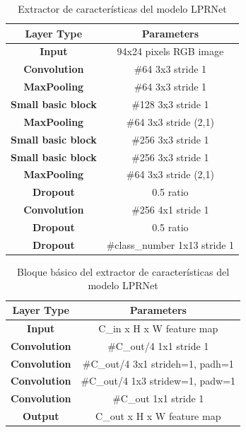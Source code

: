 \documentclass[12pt,a4paper,onecolumn,oneside]{report}
\begin{document}
\begin{table}[htb]
    \centering
    \begin{tabular}{|c|c|}
        \hline
        \textbf{Layer Type} & \textbf{Parameters}\\
        \hline
        \textbf{Input} & 94x24 pixels RGB image\\
        \hline
        \textbf{Convolution} & \#64 3x3 stride 1\\
        \hline
        \textbf{MaxPooling} & \#64 3x3 stride 1\\
        \hline
        \textbf{Small basic block} & \#128 3x3 stride 1\\
        \hline
        \textbf{MaxPooling} & \#64 3x3 stride (2,1)\\
        \hline
        \textbf{Small basic block} & \#256 3x3 stride 1\\
        \hline
        \textbf{Small basic block} & \#256 3x3 stride 1\\
        \hline
        \textbf{MaxPooling} & \#64 3x3 stride (2,1)\\
        \hline
        \textbf{Dropout} & 0.5 ratio\\
        \hline
        \textbf{Convolution} & \#256 4x1 stride 1\\
        \hline
        \textbf{Dropout} & 0.5 ratio\\
        \hline
        \textbf{Dropout} & \#class\_number 1x13 stride 1\\
        \hline
    \end{tabular}
    \caption{Extractor de características del modelo LPRNet}
    \label{tab:lprnet-backbone}
\end{table}

\begin{table}[htb]
    \centering
    \begin{tabular}{|c|c|}
        \hline
        \textbf{Layer Type} & \textbf{Parameters}\\
        \hline
        \textbf{Input} & C\_in x H x W feature map\\
        \hline
        \textbf{Convolution} & \#C\_out/4 1x1 stride 1\\
        \hline
        \textbf{Convolution} & \#C\_out/4 3x1 strideh=1, padh=1\\
        \hline
        \textbf{Convolution} & \#C\_out/4 1x3 stridew=1, padw=1\\
        \hline
        \textbf{Convolution} & \#C\_out 1x1 stride 1\\
        \hline
        \textbf{Output} & C\_out x H x W feature map\\
        \hline
    \end{tabular}
    \caption{Bloque básico del extractor de características del modelo LPRNet}
    \label{tab:lprnet-basicblock}
\end{table}
\end{document}
